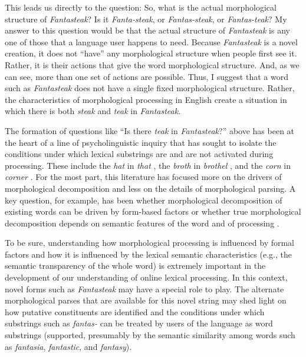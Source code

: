 \documentclass[output=paper]{langsci/langscibook}
\begin{document}
This leads us directly to the question: So, what is the actual morphological structure of \textit{Fantasteak}? Is it \textit{Fanta-steak}, or \textit{Fantas-steak}, or \textit{Fantas-teak}?  My answer to this question would be that the actual structure of \textit{Fantasteak} is any one of those that a language user happens to need.  Because \textit{Fantasteak} is a novel creation, it does not ``have'' any morphological structure when people first see it. Rather, it is their actions that give the word morphological structure. And, as we can see, more than one set of actions are possible. Thus, I suggest that a word such as \textit{Fantasteak} does not have a single fixed morphological structure. Rather, the characteristics of morphological processing in English create a situation in which there is both \textit{steak} and \textit{teak} in \textit{Fantasteak}. 

The formation of questions like ``Is there \textit{teak} in \textit{Fantasteak}?'' above has been at the heart of a line of psycholinguistic inquiry that has sought to isolate the conditions under which lexical substrings are and are not activated during processing. These include the \textit{hat} in \textit{that} \citep{BowersHanley2005},  the \textit{broth} in \textit{brothel} \citep{RastleNew2004}, and the \textit{corn} in \textit{corner} \citep{LongtinHalle2003,MorrisGrainger2008,LehtonenMPoeppel2011,LavricRastle2012}. For the most part, this literature has focused more on the drivers of morphological decomposition and less on the details of morphological parsing.  A key question, for example, has been whether morphological decomposition of existing words can be driven by form-based factors \citep{BeyersmannGrainger2016} or whether true morphological decomposition depends on semantic features of the word and of processing \citep{JärvikiviPyykkönen2011,RuecklAicher2008,MorrisHolcomb2007}. 

To be sure, understanding how morphological processing is influenced by formal factors and how it is influenced by the lexical semantic characteristics (e.g., the semantic transparency of the whole word) is extremely important in the development of our understanding of online lexical processing.  In this context, novel forms such as \textit{Fantasteak} may have a special role to play. The alternate morphological parses that are available for this novel string may shed light on how putative constituents are identified and the conditions under which substrings such as \textit{fantas-} can be treated by users of the language as word substrings (supported, presumably by the semantic similarity among words such as \textit{fantasia}, \textit{fantastic}, and \textit{fantasy}).
\end{document}
